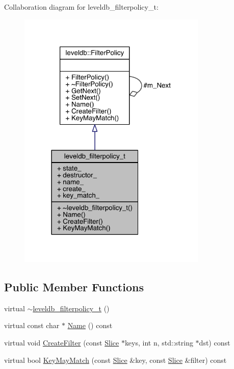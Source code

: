 Collaboration diagram for leveldb\+\_\+filterpolicy\+\_\+t\+:\nopagebreak
\begin{figure}[H]
\begin{center}
\leavevmode
\includegraphics[width=255pt]{structleveldb__filterpolicy__t__coll__graph}
\end{center}
\end{figure}
\subsection*{Public Member Functions}
\begin{DoxyCompactItemize}
\item 
virtual \hyperlink{structleveldb__filterpolicy__t_afea40a87cf4123be464f22d021dec9f3}{$\sim$leveldb\+\_\+filterpolicy\+\_\+t} ()
\item 
virtual const char $\ast$ \hyperlink{structleveldb__filterpolicy__t_a2d2e4bed02de91075ce921005c851a3e}{Name} () const 
\item 
virtual void \hyperlink{structleveldb__filterpolicy__t_a8b5b77b6a8d1c526905c7eb57d78558b}{Create\+Filter} (const \hyperlink{classleveldb_1_1_slice}{Slice} $\ast$keys, int n, std\+::string $\ast$dst) const 
\item 
virtual bool \hyperlink{structleveldb__filterpolicy__t_aa3006a26cac563bb5115d27d83b6865f}{Key\+May\+Match} (const \hyperlink{classleveldb_1_1_slice}{Slice} \&key, const \hyperlink{classleveldb_1_1_slice}{Slice} \&filter) const 
\end{DoxyCompactItemize}
